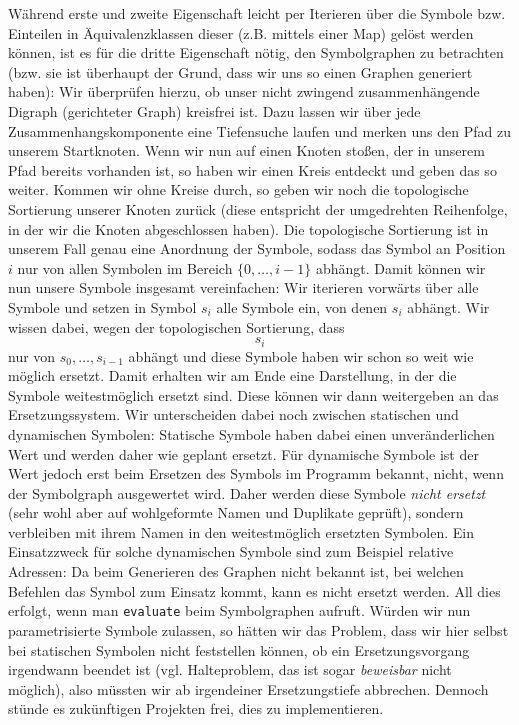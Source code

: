 Während erste und zweite Eigenschaft leicht per Iterieren über die Symbole bzw.
Einteilen in Äquivalenzklassen dieser (z.B. mittels einer Map) gelöst werden
können, ist es für die dritte Eigenschaft nötig, den Symbolgraphen zu betrachten
(bzw. sie ist überhaupt der Grund, dass wir uns so einen Graphen generiert
haben): Wir überprüfen hierzu, ob unser nicht zwingend zusammenhängende Digraph
(gerichteter Graph) kreisfrei ist. Dazu lassen wir über jede
Zusammenhangskomponente eine Tiefensuche laufen und merken uns den Pfad zu
unserem Startknoten. Wenn wir nun auf einen Knoten stoßen, der in unserem Pfad
bereits vorhanden ist, so haben wir einen Kreis entdeckt und geben das so
weiter. Kommen wir ohne Kreise durch, so geben wir noch die topologische
Sortierung unserer Knoten zurück (diese entspricht der umgedrehten Reihenfolge,
in der wir die Knoten abgeschlossen haben). Die topologische Sortierung ist in
unserem Fall genau eine Anordnung der Symbole, sodass das Symbol an Position $i$
nur von allen Symbolen im Bereich $\{0,\dots,i-1\}$ abhängt. Damit können wir
nun unsere Symbole insgesamt vereinfachen: Wir iterieren vorwärts über alle
Symbole und setzen in Symbol $s_i$ alle Symbole ein, von denen $s_i$ abhängt.
Wir wissen dabei, wegen der topologischen Sortierung, dass $$s_i$$ nur von
$s_0,\dots,s_{i-1}$ abhängt und diese Symbole haben wir schon so weit wie
möglich ersetzt. Damit erhalten wir am Ende eine Darstellung, in der die Symbole
weitestmöglich ersetzt sind. Diese können wir dann weitergeben an das
Ersetzungssystem. Wir unterscheiden dabei noch zwischen statischen und
dynamischen Symbolen: Statische Symbole haben dabei einen unveränderlichen Wert
und werden daher wie geplant ersetzt. Für dynamische Symbole ist der Wert jedoch
erst beim Ersetzen des Symbols im Programm bekannt, nicht, wenn der Symbolgraph
ausgewertet wird. Daher werden diese Symbole \emph{nicht ersetzt} (sehr wohl
aber auf wohlgeformte Namen und Duplikate geprüft), sondern verbleiben mit ihrem
Namen in den weitestmöglich ersetzten Symbolen. Ein Einsatzzweck für solche
dynamischen Symbole sind zum Beispiel relative Adressen: Da beim Generieren des
Graphen nicht bekannt ist, bei welchen Befehlen das Symbol zum Einsatz kommt,
kann es nicht ersetzt werden. All dies erfolgt, wenn man \texttt{evaluate} beim
Symbolgraphen aufruft. Würden wir nun parametrisierte Symbole zulassen, so
hätten wir das Problem, dass wir hier selbst bei statischen Symbolen nicht
feststellen können, ob ein Ersetzungsvorgang irgendwann beendet ist (vgl.
Halteproblem, das ist sogar \emph{beweisbar} nicht möglich), also müssten wir ab
irgendeiner Ersetzungstiefe abbrechen. Dennoch stünde es zukünftigen Projekten
frei, dies zu implementieren.

